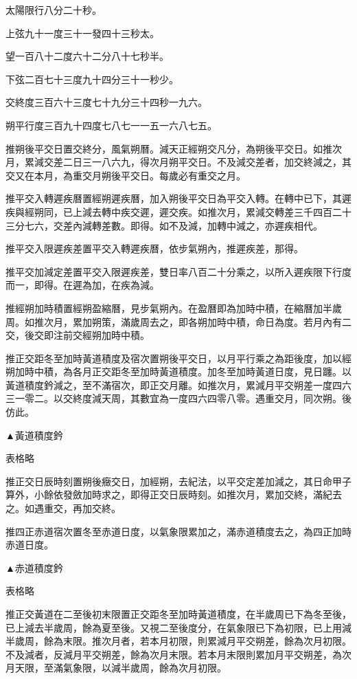 太陽限行八分二十秒。

上弦九十一度三十一發四十三秒太。

望一百八十二度六十二分八十七秒半。

下弦二百七十三度九十四分三十一秒少。

交終度三百六十三度七十九分三十四秒一九六。

朔平行度三百九十四度七八七一一五一六八七五。

推朔後平交日置交終分，風氣朔曆。減天正經朔交凡分，為朔後平交日。如推次月，累減交差二日三一八六九，得次月朔平交日。不及減交差者，加交終減之，其交又在本月，為重交月朔後平交日。每歲必有重交之月。

推平交入轉遲疾曆置經朔遲疾曆，加入朔後平交日為平交入轉。在轉中已下，其遲疾與經朔同，已上減去轉中疾交遲，遲交疾。如推次月，累減交轉差三千四百二十三分七六，交差內減轉差數。即得。如不及減，加轉中減之，亦遲疾相代。

推平交入限遲疾差置平交入轉遲疾曆，依步氣朔內，推遲疾差，那得。

推平交加減定差置平交入限遲疾差，雙日率八百二十分乘之，以所入遲疾限下行度而一，即得。在遲為加，在疾為減。

推經朔加時積置經朔盈縮曆，見步氣朔內。在盈曆即為加時中積，在縮曆加半歲周。如推次月，累加朔策，滿歲周去之，即各朔加時中積，命日為度。若月內有二交，後交即注前交經朔加時中積。

推正交距冬至加時黃道積度及宿次置朔後平交日，以月平行乘之為距後度，加以經朔加時中積，為各月正交距冬至加時黃道積度。加冬至加時黃道日度，見日躔。以黃道積度鈐減之，至不滿宿次，即正交月離。如推次月，累減月平交朔差一度四六三一零二。以交終度減天周，其數宜為一度四六四零八零。遇重交月，同次朔。後仿此。

▲黃道積度鈐

表格略

推正交日辰時刻置朔後癥交日，加經朔，去紀法，以平交定差加減之，其日命甲子算外，小餘依發斂加時求之，即得正交日辰時刻。如推次月，累加交終，滿紀去之。如遇重交，再加交終。

推四正赤道宿次置冬至赤道日度，以氣象限累加之，滿赤道積度去之，為四正加時赤道日度。

▲赤道積度鈐

表格略

推正交黃道在二至後初末限置正交距冬至加時黃道積度，在半歲周已下為冬至後，已上減去半歲周，餘為夏至後。又視二至後度分，在氣象限已下為初限，已上用減半歲周，餘為末限。推次月者，若本月初限，則累減月平交朔差，餘為次月初限。不及減者，反減月平交朔差，餘為次月末限。若本月末限則累加月平交朔差，為次月天限，至滿氣象限，以減半歲周，餘為次月初限。


